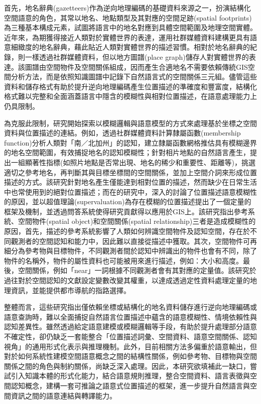首先，地名辭典(gazetteers)作為逆向地理編碼的基礎資料來源之一，扮演結構化空間語意的角色，其常以地名、地點類型及其對應的空間足跡(spatial footprints)為三種基本構成元素\parencite{RN122, RN159, RN31}，試圖將語言中的地名對應到具體空間範圍及地理空間實體。近年來，為期獲得接近人類對於實體世界的表達，運用社群媒體資料建構更具有語意細緻度的地名辭典，藉此貼近人類對實體世界的描述習慣\parencite{RN31}。相對於地名辭典的紀錄，\textcite{RN23}則一樣透過社群媒體資料，但以地方圖譜(place graph)儲存人對實體世界的表達。該圖譜由空間物件及空間關係組成，因而產生合適地名不需要依賴傳統GIS空間分析方法，而是依照知識圖譜中記錄下自然語言式的空間關係三元組。儘管這些資料和儲存格式有助於提升逆向地理編碼產生位置描述的準確度和豐富度，結構化格式難以完整和全面涵蓋語言中隱含的模糊性與相對位置描述，在語意處理能力上仍具限制。

為克服此限制，研究開始探索以模糊邏輯與語意模型的方式來處理基於坐標之空間資料與位置描述的連結。例如，\textcite{RN133}透過社群媒體資料計算隸屬函數(membership function)分析人類對「南／北加州」的認知，建立隸屬函數網格推估具有模糊邊界的地名空間範圍，有效捕捉地名的認知模糊性；\textcite{RN164}針對相片地點的自然語言產生，提出一組顯著性指標(如照片地點是否常出現、地名的稀少和重要性、距離等)，挑選適切之參考地名，再判斷其與目標坐標間的空間關係，並加上空間介詞來形成位置描述的方式。該研究針對地名產生僅能達到相對位置的描述，然而缺少在日常生活中也常使用到的絕對位置描述；而在\textcite{RN128}的研究中，深入的討論了位置描述語意模糊性的原因，並以超值理論(supervaluation)為存在模糊的位置描述提出了一個定量的框架及機制，並透過問答系統使得研究貢獻得以應用於GIS上。該研究指出參考系統、空間物件(spatial object)和空間關係(spatial relationship)三者是造成模糊性的原因，首先，描述的參考系統影響了人類如何辨識空間物件及認知空間，存在於不同觀測者的空間認知和能力中，因此難以直接從描述中獲取。其次，空間物件可再細分為參考物與目標物件，不同觀測者間於認知中辨識出的物件也會有不同，除了物件的名稱外，物件的屬性資料也可能被用來進行描述，例如：大小和高度。最後，空間關係，例如「near」一詞根據不同觀測者會有其對應的定量值。該研究於過往對於空間認知的文獻設定變數改變其權重，以達成透過定性資料處理定量的地理資訊，並能提供都市導航的指路選擇。

整體而言，這些研究指出僅依賴坐標或結構化的地名資料儲存進行逆向地理編碼或語意查詢時，難以全面捕捉自然語言位置描述中蘊含的語意模糊性、情境依賴性與認知差異性。雖然透過給定語意建模或模糊邏輯等手段，有助於提升處理部分語意不確定性，卻仍缺乏一套能整合「位置描述詞彙、空間資料、語意空間關係、認知視角」的通用形式化表示與推理機制。此外，目前相關方法多偏重於語意輸出，但對於如何系統性建模空間語意概念之間的結構性關係，例如參考物、目標物與空間關係之間的角色與制約關係，尚缺乏深入處理。因此，本研究欲填補此一缺口，嘗試引入知識本體的形式化能力，結合語意規則推理，整合空間資料、語言表徵與空間認知概念，建構一套可推論之語意式位置描述的框架，進一步提升自然語言與空間資訊之間的語意連結與轉譯能力。

